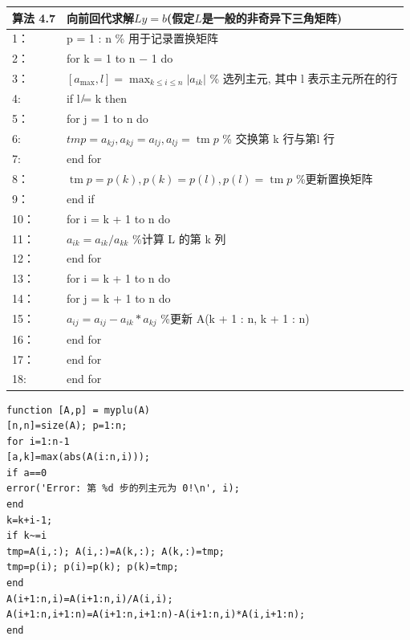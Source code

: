 \documentclass[12pt,a4paper]{article}
\begin{document}
\begin{table}  
	\begin{tabular*}{16cm}{ll}  
		\hline  
		算法 4.7 &向前回代求解$Ly =b$(假定$L$是一般的非奇异下三角矩阵)\\  
		\hline  
		1：   & p = 1 : n \% 用于记录置换矩阵\\  
		2：   & for k = 1 to n − 1 do\\
		3：   & \qquad $\left[a_{\max }, l\right]=\max _{k \leq i \leq n}\left|a_{i k}\right|$ \% 选列主元, 其中 l 表示主元所在的行 \\
		4:    & \qquad if l ̸= k then\\
		5：   & \qquad \qquad for j = 1 to n do\\
		6:    & \qquad \qquad \qquad $t m p=a_{k j}, a_{k j}=a_{l j}, a_{l j}=\operatorname{tm} p$ \% 交换第 k 行与第l 行\\
		7:    &\qquad \qquad end for\\
		8：   & \qquad \qquad $\operatorname{tm} p=p(k), p(k)=p(l), p(l)=\operatorname{tm} p$ \%更新置换矩阵 \\
		9：   & \qquad end if\\
	   10：   & \qquad for i = k + 1 to n do\\
	   11：   & \qquad \qquad $a_{i k}=a_{i k} / a_{k k}$ \%计算 L 的第 k 列\\
	   12：   & \qquad end for\\
	   13：   & \qquad for i = k + 1 to n do\\
	   14：   & \qquad \qquad for j = k + 1 to n do\\
	   15：   & \qquad \qquad \qquad $a_{i j}=a_{i j}-a_{i k} * a_{k j}$ \%更新 A(k + 1 : n, k + 1 : n) \\
	   16：   & \qquad \qquad end for \\
	   17：   & \qquad end for \\
	   18:    & end for \\
		\hline  
	\end{tabular*}  
\end{table}

\begin{lstlisting}[language={[ANSI]C}] 
% Matlab code 2 : 部分选主元 LU 分解
function [A,p] = myplu(A)
[n,n]=size(A); p=1:n;
for i=1:n-1
[a,k]=max(abs(A(i:n,i)));
if a==0
error('Error: 第 %d 步的列主元为 0!\n', i);
end
k=k+i-1;
if k~=i
tmp=A(i,:); A(i,:)=A(k,:); A(k,:)=tmp;
tmp=p(i); p(i)=p(k); p(k)=tmp;
end
A(i+1:n,i)=A(i+1:n,i)/A(i,i);
A(i+1:n,i+1:n)=A(i+1:n,i+1:n)-A(i+1:n,i)*A(i,i+1:n);
end
\end{lstlisting}
\end{document}
